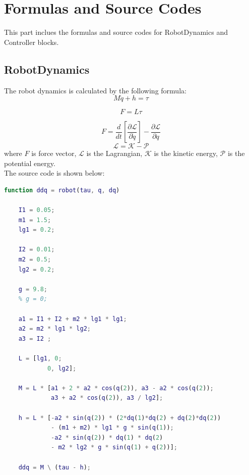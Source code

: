 \documentclass{article}
\begin{document}
\section{Formulas and Source Codes}
This part inclues the formulas and source codes for RobotDynamics and Controller blocks.
\subsection*{RobotDynamics}
The robot dynamics is calculated by the following formula:
    \begin{equation}
        M \ddot{q} + h = \tau
    \end{equation}

    \begin{equation}
        F = L \tau
    \end{equation}

    \begin{equation}
        F = \frac{d}{dt} \left[ \frac{\partial\mathcal{L}}{\partial \dot{q}}\right] - \frac{\partial\mathcal{L}}{\partial q}
    \end{equation}
    \begin{equation}
        \mathcal{L} = \mathcal{K} - \mathcal{P}
    \end{equation}
where $F$ is force vector, $\mathcal{L}$ is the Lagrangian, $\mathcal{K}$ is the kinetic energy, $\mathcal{P}$ is the potential energy.\\

The source code is shown below:
\begin{lstlisting}[language=Matlab, basicstyle=\small\ttfamily]
function ddq = robot(tau, q, dq)

    I1 = 0.05;
    m1 = 1.5;
    lg1 = 0.2;
    
    I2 = 0.01;
    m2 = 0.5;
    lg2 = 0.2;
    
    g = 9.8;
    % g = 0;
    
    a1 = I1 + I2 + m2 * lg1 * lg1;
    a2 = m2 * lg1 * lg2;
    a3 = I2 ;
    
    L = [lg1, 0;
            0, lg2];
    
    M = L * [a1 + 2 * a2 * cos(q(2)), a3 - a2 * cos(q(2));
             a3 + a2 * cos(q(2)), a3 / lg2];
    
    h = L * [-a2 * sin(q(2)) * (2*dq(1)*dq(2) + dq(2)*dq(2)) 
             - (m1 + m2) * lg1 * g * sin(q(1));
             -a2 * sin(q(2)) * dq(1) * dq(2) 
             - m2 * lg2 * g * sin(q(1) + q(2))];
    
    ddq = M \ (tau - h);
    
\end{lstlisting}
\end{document}
